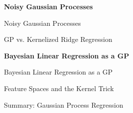 \begin{frame}[c]{}
\centering
\huge
\textbf{Noisy Gaussian Processes}
\end{frame}


\begin{frame}[c]{Noisy Gaussian Processes}



\end{frame}


\begin{frame}[c]{GP vs. Kernelized Ridge Regression}



\end{frame}


\begin{frame}[c]{}
\centering
\huge
\textbf{Bayesian Linear Regression as a GP}
\end{frame}


\begin{frame}[c]{Bayesian Linear Regression as a GP}



\end{frame}


\begin{frame}[c,allowframebreaks]{Feature Spaces and the Kernel Trick}


\framebreak



\end{frame}


\begin{frame}[c]{Summary: Gaussian Process Regression}


\end{frame}


